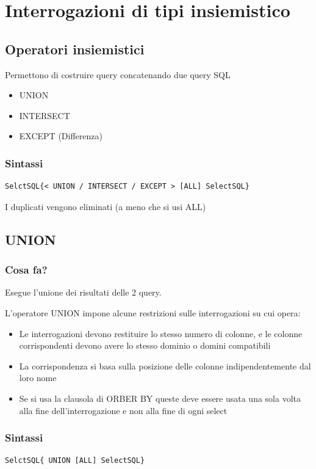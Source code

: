 \chapter{Interrogazioni di tipi insiemistico}
\section{Operatori insiemistici}
Permettono di costruire query concatenando due query SQL
\begin{itemize}
    \item UNION
    \item INTERSECT
    \item EXCEPT (Differenza)
\end{itemize}

\subsection{Sintassi}
\begin{lstlisting}[language=sql_generic]
SelctSQL{< UNION / INTERSECT / EXCEPT > [ALL] SelectSQL}
\end{lstlisting}

I duplicati vengono eliminati (a meno che si usi ALL)


\section{UNION}
\subsection{Cosa fa?}
Esegue l'unione dei risultati delle 2 query.

L'operatore UNION impone alcune restrizioni sulle interrogazioni su cui opera:
\begin{itemize}
    \item Le interrogazioni devono restituire lo stesso numero di colonne, e le colonne corrispondenti devono avere lo stesso dominio o domini compatibili
    \item La corrispondenza si basa sulla posizione delle colonne indipendentemente dal loro nome
    \item Se si usa la clausola di ORBER BY queste deve essere usata una sola volta alla fine dell'interrogazione e non alla fine di ogni select
\end{itemize}

\subsection{Sintassi}
\begin{lstlisting}[language=sql_generic]
SelctSQL{ UNION [ALL] SelectSQL}
\end{lstlisting}

